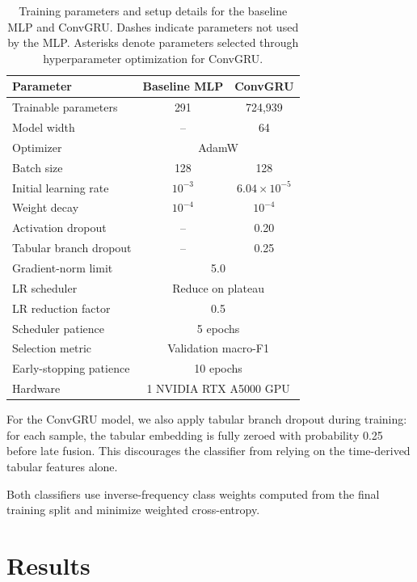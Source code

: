 \documentclass[sigconf,nonacm]{acmart}
\begin{document}
\begin{table}[t]
  \caption{Training parameters and setup details for the baseline MLP and
  ConvGRU. Dashes indicate parameters not used by the MLP.
  Asterisks denote parameters selected through hyperparameter optimization
  for ConvGRU.}
  \label{tab:training-configuration}
  \centering
  \small
  \begin{tabular}{@{}lcc@{}}
    \toprule
    Parameter & Baseline MLP & ConvGRU \\
    \midrule
    Trainable parameters & 291 & 724,939 \\
    Model width{\normalsize *} & -- & 64 \\
    Optimizer & \multicolumn{2}{c}{AdamW} \\
    Batch size & 128 & 128 \\
    Initial learning rate{\normalsize *} & $10^{-3}$ & $6.04 \times 10^{-5}$ \\
    Weight decay{\normalsize *} & $10^{-4}$ & $10^{-4}$ \\
    Activation dropout{\normalsize *} & -- & 0.20 \\
    Tabular branch dropout & -- & 0.25 \\
    Gradient-norm limit & \multicolumn{2}{c}{5.0} \\
    LR scheduler & \multicolumn{2}{c}{Reduce on plateau} \\
    LR reduction factor & \multicolumn{2}{c}{0.5} \\
    Scheduler patience & \multicolumn{2}{c}{5 epochs} \\
    Selection metric & \multicolumn{2}{c}{Validation macro-F1} \\
    Early-stopping patience & \multicolumn{2}{c}{10 epochs} \\
    Hardware & \multicolumn{2}{c}{1 NVIDIA RTX A5000 GPU} \\
    \bottomrule
  \end{tabular}
\end{table}

For the ConvGRU model, we also apply tabular branch dropout during training: for
each sample, the tabular embedding is fully zeroed with
probability 0.25 before late fusion. This discourages the classifier from
relying on the time-derived tabular features alone.

Both classifiers use inverse-frequency class weights computed from the final
training split and minimize weighted cross-entropy.

\section{Results}
\end{document}
